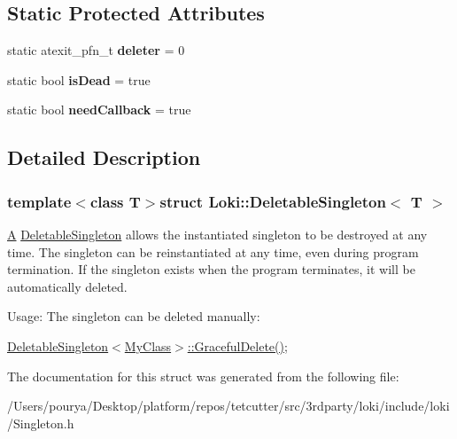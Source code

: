 \subsection*{Static Protected Attributes}
\begin{DoxyCompactItemize}
\item 
\hypertarget{classLoki_1_1DeletableSingleton_a0d2bcad67762e4cc88e926386bfab002}{}static atexit\+\_\+pfn\+\_\+t {\bfseries deleter} = 0\label{classLoki_1_1DeletableSingleton_a0d2bcad67762e4cc88e926386bfab002}

\item 
\hypertarget{classLoki_1_1DeletableSingleton_a62fc02272ad280316f3e6fb27272994a}{}static bool {\bfseries is\+Dead} = true\label{classLoki_1_1DeletableSingleton_a62fc02272ad280316f3e6fb27272994a}

\item 
\hypertarget{classLoki_1_1DeletableSingleton_a5cec2ed562f3292accfa9468c37ea052}{}static bool {\bfseries need\+Callback} = true\label{classLoki_1_1DeletableSingleton_a5cec2ed562f3292accfa9468c37ea052}

\end{DoxyCompactItemize}


\subsection{Detailed Description}
\subsubsection*{template$<$class T$>$struct Loki\+::\+Deletable\+Singleton$<$ T $>$}

\hyperlink{structA}{A} \hyperlink{classLoki_1_1DeletableSingleton}{Deletable\+Singleton} allows the instantiated singleton to be destroyed at any time. The singleton can be reinstantiated at any time, even during program termination. If the singleton exists when the program terminates, it will be automatically deleted.

\begin{DoxyParagraph}{Usage\+: }
The singleton can be deleted manually\+:
\end{DoxyParagraph}
\hyperlink{classLoki_1_1DeletableSingleton_a626c2dc57146f1aea6bf911682f8e3e9}{Deletable\+Singleton$<$\+My\+Class$>$\+::\+Graceful\+Delete()}; 

The documentation for this struct was generated from the following file\+:\begin{DoxyCompactItemize}
\item 
/\+Users/pourya/\+Desktop/platform/repos/tetcutter/src/3rdparty/loki/include/loki/Singleton.\+h\end{DoxyCompactItemize}
